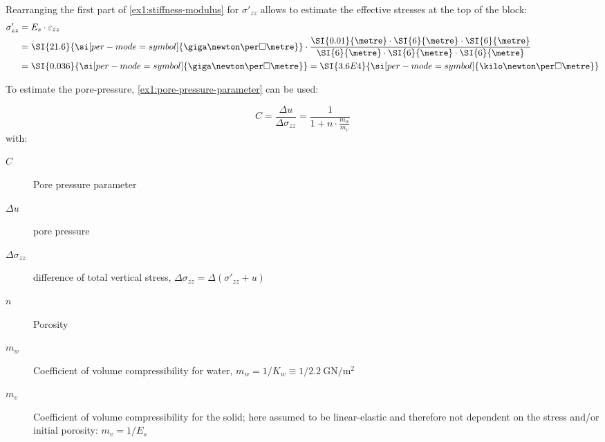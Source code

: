 Rearranging the first part of \autoref{ex1:stiffness-modulus} for
$\sigma'_{zz}$ allows to estimate the effective stresses at the top of the
block:
\begin{equation}
    \label{ex1:effective_vertical_stress}
    \begin{split}
        \sigma'_{zz} & = E_s \cdot \varepsilon_{zz}                                                                                                                                                                               \\
                     & = \SI{21.6}{\si[per-mode = symbol]{\giga\newton\per\square\metre}} \cdot \frac{ \SI{0.01}{\metre} \cdot \SI{6}{\metre} \cdot \SI{6}{\metre} }{ \SI{6}{\metre} \cdot  \SI{6}{\metre} \cdot  \SI{6}{\metre}} \\
                     & = \SI{0.036}{\si[per-mode = symbol]{\giga\newton\per\square\metre}} = \SI{3.6E4}{\si[per-mode = symbol]{\kilo\newton\per\square\metre}}
    \end{split}
\end{equation}

\vspace{1em}

To estimate the pore-pressure, \autoref{ex1:pore-pressure-parameter} can be used:

\begin{equation}
    \label{ex1:pore-pressure-parameter}
    C = \frac{\Delta u}{\Delta \sigma_{zz}} = \frac{1}{1 + n \cdot \frac{m_w}{m_v}}
\end{equation}
with:
\begin{description}
    \item[$C$] Pore pressure parameter
    \item[$\Delta u$] pore pressure
    \item[$\Delta \sigma_{zz}$] difference of total vertical stress, $\Delta \sigma_{zz} = \Delta (\sigma'_{zz} + u)$
    \item[$n$] Porosity
    \item[$m_w$] Coefficient of volume compressibility for water, $m_w = 1/K_w \equiv 1/{\SI[per-mode = symbol]{2.2}{\giga\newton\per\square\metre}}$
    \item[$m_v$] Coefficient of volume compressibility for the solid; here assumed to be linear-elastic and therefore not dependent on the stress and/or initial porosity: $m_v = 1 / E_s$
\end{description}

